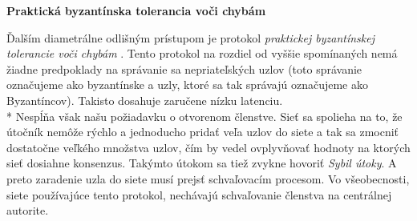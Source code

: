 \newpage

\begin{flushleft}\textbf {Praktická byzantínska tolerancia voči chybám}\end{flushleft}
\vspace{-4mm}
Ďalším diametrálne odlišným prístupom je protokol \textit{praktickej byzantínskej
tolerancie voči chybám} \cite{castro1999practical}.
Tento protokol na rozdiel od vyššie spomínaných nemá žiadne predpoklady na
správanie sa nepriateľských uzlov (toto správanie označujeme ako byzantínske a uzly,
ktoré sa tak správajú označujeme ako Byzantíncov).
Takisto dosahuje zaručene nízku latenciu.
\\*
Nespĺňa však našu požiadavku o otvorenom členstve. Sieť sa spolieha na to, že
útočník nemôže rýchlo a jednoducho pridať veľa uzlov do siete a tak sa
zmocniť dostatočne veľkého množstva uzlov, čím by vedel ovplyvňovať hodnoty na ktorých
sieť dosiahne konsenzus.
Takýmto útokom sa tiež zvykne hovoriť \textit{Sybil útoky}.
A preto zaradenie uzla do siete musí prejsť schvaľovacím procesom.
Vo všeobecnosti, siete používajúce tento protokol, nechávajú schvaľovanie
členstva na centrálnej autorite.
